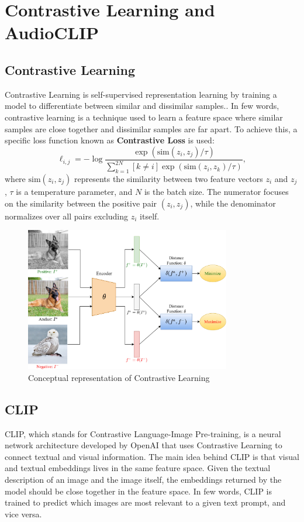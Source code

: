 \section{Contrastive Learning and AudioCLIP}
\subsection{Contrastive Learning}
Contrastive Learning is self-supervised representation learning by training a model to differentiate between similar and dissimilar samples.\cite{ContrastiveLearning}. In few words, contrastive learning is a technique used to learn a feature space where similar samples are close together and dissimilar samples are far apart. To achieve this, a specific loss function known as \textbf{Contrastive Loss} is used:
\begin{equation}
\ell_{i,j} = -\log \frac{\exp(\text{sim}(z_i, z_j)/\tau)}{\sum_{k=1}^{2N} [k \neq i] \exp(\text{sim}(z_i, z_k)/\tau)},
\end{equation}
where $\text{sim}(z_i, z_j)$ represents the similarity between two feature vectors $z_i$ and $z_j$, $\tau$ is a temperature parameter, and $N$ is the batch size. The numerator focuses on the similarity between the positive pair $(z_i, z_j)$, while the denominator normalizes over all pairs excluding $z_i$ itself.

\begin{figure}[H]
    \centering
    \includegraphics[width=0.8\textwidth]{img/CLearning.png}
    \caption{Conceptual representation of Contrastive Learning}
\end{figure}

\subsection{CLIP}
CLIP, which stands for Contrastive Language-Image Pre-training, is a neural network architecture developed by OpenAI\cite{CLIP} that uses Contrastive Learning to connect textual and visual information. The main idea behind CLIP is that visual and textual embeddings lives in the same feature space. Given the textual description of an image and the image itself, the embeddings returned by the model should be close together in the feature space. In few words, CLIP is trained to predict which images are most relevant to a given text prompt, and vice versa.

